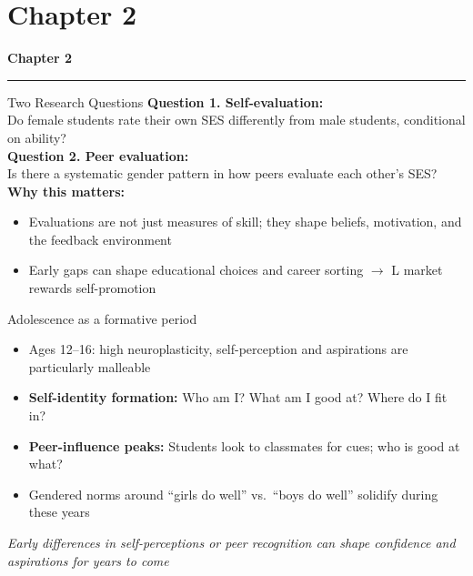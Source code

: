 \documentclass[xcolor=usenames,dvipsnames]{beamer}
\begin{document}
\section{Chapter 2}
\begin{frame}[plain]
\vspace{2.5cm}
{\LARGE \textbf{Chapter 2}}\\
{\color{HopBlue}\rule{0.4\linewidth}{2pt}}
\end{frame}
\addtocounter{framenumber}{-1}
\begin{frame}{Two Research Questions}
\small
\textbf{Question 1. Self-evaluation:}\\
Do female students rate their own SES differently from male students, conditional on ability? \\
\vspace{0.3cm}
\textbf{Question 2. Peer evaluation:}\\
Is there a systematic gender pattern in how peers evaluate each other's SES? \\
\vspace{0.5cm}
\textbf{Why this matters:}
\begin{itemize}
    \item Evaluations are not just measures of skill; they shape beliefs, motivation, and the feedback environment
    \item Early gaps can shape educational choices and career sorting $\rightarrow$ L market rewards self-promotion
\end{itemize}
\end{frame}
\begin{frame}{Adolescence as a formative period}
\small
\begin{itemize}
    \item Ages 12--16: high neuroplasticity, self-perception and aspirations are particularly malleable \citep{Steinberg2014-pe}
    \item \textbf{Self-identity formation:} Who am I? What am I good at? Where do I fit in?
    \item \textbf{Peer-influence peaks:} Students look to classmates for cues; who is good at what?
    \item Gendered norms around ``girls do well'' vs.\ ``boys do well'' solidify during these years
\end{itemize}
\vspace{0.5cm}
\textit{Early differences in self-perceptions or peer recognition can shape confidence and aspirations for years to come}
\end{frame}
\end{document}

